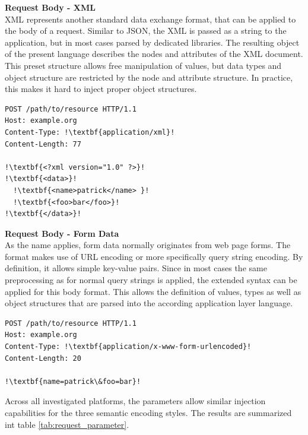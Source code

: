 \textbf{Request Body - XML}\\
XML represents another standard data exchange format, that can be applied to the body of a request. Similar to JSON, the XML is passed as a string to the application, but in most cases parsed by dedicated libraries. The resulting object of the present language describes the nodes and attributes of the XML document. This preset structure allows free manipulation of values, but data types and object structure are restricted by the node and attribute structure. In practice, this makes it hard to inject proper object structures.\\

\begin{lstlisting}[escapechar=!, caption={Example for HTTP request}, label={lst:http_request_example}]
POST /path/to/resource HTTP/1.1
Host: example.org
Content-Type: !\textbf{application/xml}!
Content-Length: 77

!\textbf{<?xml version="1.0" ?>}!
!\textbf{<data>}!
  !\textbf{<name>patrick</name> }!
  !\textbf{<foo>bar</foo>}!
!\textbf{</data>}!
\end{lstlisting}

\textbf{Request Body - Form Data}\\
As the name applies, form data normally originates from web page forms. The format makes use of URL encoding or more specifically query string encoding. By definition, it allows simple key-value pairs. Since in most cases the same preprocessing as for normal query strings is applied, the extended syntax can be applied for this body format. This allows the definition of values, types as well as object structures that are parsed into the according application layer language.\\

\begin{lstlisting}[escapechar=!, caption={Example for HTTP request}, label={lst:http_request_example}]
POST /path/to/resource HTTP/1.1
Host: example.org
Content-Type: !\textbf{application/x-www-form-urlencoded}!
Content-Length: 20

!\textbf{name=patrick\&foo=bar}!
\end{lstlisting}

Across all investigated platforms, the parameters allow similar injection capabilities for the three semantic encoding styles. The results are summarized int table \ref{tab:request_parameter}.

